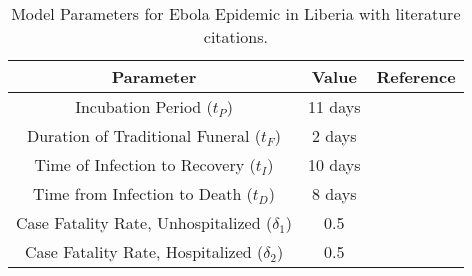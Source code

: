 \begin{table}[ht]
\centering %
\begin{tabular}{c c c}
\hline\hline %
Parameter & Value  & Reference \\ [0.5ex]
\hline %
Incubation Period (${t_{P}}$) & 11 days & \cite{WHOFacts} \\
Duration of Traditional Funeral (${t_{F}}$) & 2 days & \cite{Rivers2014} \\
Time of Infection to Recovery (${t_{I}}$) & 10 days & \cite{Rivers2014} \\
Time from Infection to Death (${t_{D}}$) & 8 days & \cite{Rivers2014} \\
Case Fatality Rate, Unhospitalized ($\delta_{1}$) & 0.5 & \cite{WHOFacts} \\
Case Fatality Rate, Hospitalized ($\delta_{2}$) & 0.5 & \cite{WHOFacts} \\ [1ex]
\hline
\end{tabular}
\caption{Model Parameters for Ebola Epidemic in Liberia with literature citations.} %
\label{tab:knownParameters}
\end{table}

\clearpage